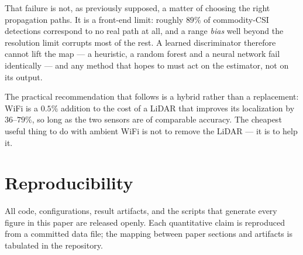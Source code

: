 \documentclass[journal]{IEEEtran}
\begin{document}
That failure is not, as previously supposed, a matter of choosing the right propagation paths.
It is a front-end limit: roughly $89\%$ of commodity-CSI detections correspond to no real path
at all, and a range \emph{bias} well beyond the resolution limit corrupts most of the rest.
A learned discriminator therefore cannot lift the map --- a heuristic, a random forest and a
neural network fail identically --- and any method that hopes to must act on the estimator, not
on its output.

The practical recommendation that follows is a hybrid rather than a replacement: WiFi is a
$0.5\%$ addition to the cost of a LiDAR that improves its localization by $36$--$79\%$, so long
as the two sensors are of comparable accuracy. The cheapest useful thing to do with ambient
WiFi is not to remove the LiDAR --- it is to help it.

\section*{Reproducibility}
All code, configurations, result artifacts, and the scripts that generate every figure in this
paper are released openly. Each quantitative claim is reproduced from a committed data file; the
mapping between paper sections and artifacts is tabulated in the repository.



\end{document}
